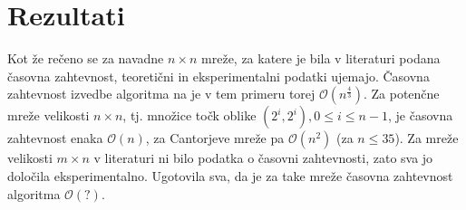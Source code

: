 \documentclass[a4paper]{article}
\begin{document}
\newpage
\section{Rezultati}
Kot že rečeno se za navadne $n \times n$ mreže, za katere je bila v literaturi podana časovna zahtevnost, teoretični in eksperimentalni podatki ujemajo. Časovna zahtevnost izvedbe algoritma na
je v tem primeru torej $\mathcal{O}(n ^ \frac{4}{3})$. Za potenčne mreže velikosti $n \times n$, tj. množice točk oblike $(2^i, 2^i), 0 \leq i \leq n - 1$, je časovna zahtevnost enaka
$\mathcal{O}(n)$, za Cantorjeve mreže pa $\mathcal{O}(n^2)$ (za $n \leq 35$).
Za mreže velikosti $m \times n$ v literaturi ni bilo podatka o časovni zahtevnosti, zato sva jo določila eksperimentalno. Ugotovila sva, da je za take mreže časovna zahtevnost algoritma 
$\mathcal{O}(?)$. 
\end{document}
